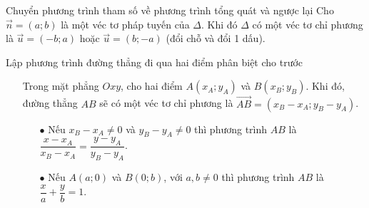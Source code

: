 \begin{dang}{Chuyển phương trình tham số về phương trình tổng quát và ngược lại}
	 Cho $\vec{n}=(a;b)$ là một véc tơ pháp tuyến của $\Delta$. Khi đó $\Delta$ có một véc tơ chỉ phương là $\vec{u}=(-b;a)$ hoặc $\vec{u}=(b;-a)$ (đổi chỗ và đổi 1 dấu).
\end{dang}

\begin{dang}{Lập phương trình đường thẳng đi qua hai điểm phân biệt cho trước}
	\begin{itemize}
		\item [\iconMT] Trong mặt phẳng $Oxy$, cho hai điểm $A(x_A;y_A)$ và $B(x_B;y_B)$. Khi đó, đường thẳng $AB$ sẽ có một véc tơ chỉ phương là $\vec{AB}=(x_B-x_A;y_B-y_A)$.
		\item [\iconMT] 
		\begin{itemize}
			\item [$\bullet$] Nếu $x_B-x_A \ne 0$ và $y_B-y_A \ne 0$ thì phương trình $AB$ là
			$\dfrac{x-x_A}{x_B-x_A}=\dfrac{y-y_A}{y_B-y_A}$.
			\item [$\bullet$] Nếu $A(a;0)$ và $B(0;b)$, với $a,b \ne 0$ thì phương trình $AB$ là $\dfrac{x}{a}+\dfrac{y}{b}=1$.
		\end{itemize}
	\end{itemize}
\end{dang}

